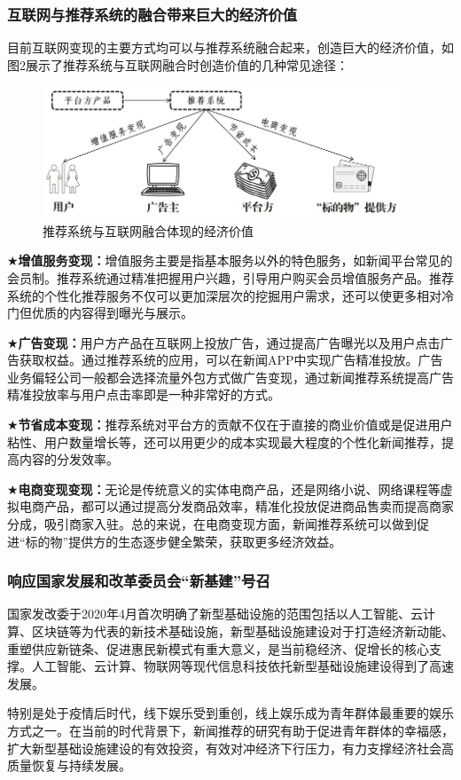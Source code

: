 \documentclass[withoutpreface,bwprint]{cumcmthesis} %
\begin{document}
	\subsubsection{ 互联网与推荐系统的融合带来巨大的经济价值}
	目前互联网变现的主要方式均可以与推荐系统融合起来，创造巨大的经济价值，如图2展示了推荐系统与互联网融合时创造价值的几种常见途径：
	\begin{figure}[H]
		\centering
		\includegraphics[width=0.95\textwidth]{1}
		\caption{推荐系统与互联网融合体现的经济价值}
		\label{fig:circuit-diagcam}
	\end{figure}
	$\bigstar$\textbf{增值服务变现：}增值服务主要是指基本服务以外的特色服务，如新闻平台常见的会员制。推荐系统通过精准把握用户兴趣，引导用户购买会员增值服务产品。推荐系统的个性化推荐服务不仅可以更加深层次的挖掘用户需求，还可以使更多相对冷门但优质的内容得到曝光与展示。\par
	$\bigstar$\textbf{广告变现：}用户方产品在互联网上投放广告，通过提高广告曝光以及用户点击广告获取权益。通过推荐系统的应用，可以在新闻APP中实现广告精准投放。广告业务偏轻公司一般都会选择流量外包方式做广告变现，通过新闻推荐系统提高广告精准投放率与用户点击率即是一种非常好的方式。\par
	$\bigstar$\textbf{节省成本变现：}推荐系统对平台方的贡献不仅在于直接的商业价值或是促进用户粘性、用户数量增长等，还可以用更少的成本实现最大程度的个性化新闻推荐，提高内容的分发效率。\par
	$\bigstar$\textbf{电商变现变现：}无论是传统意义的实体电商产品，还是网络小说、网络课程等虚拟电商产品，都可以通过提高分发商品效率，精准化投放促进商品售卖而提高商家分成，吸引商家入驻。总的来说，在电商变现方面，新闻推荐系统可以做到促进“标的物”提供方的生态逐步健全繁荣，获取更多经济效益。\par
	\subsubsection{ 响应国家发展和改革委员会“新基建”号召}
	 国家发改委于2020年4月首次明确了新型基础设施的范围包括以人工智能、云计算、区块链等为代表的新技术基础设施，新型基础设施建设对于打造经济新动能、重塑供应新链条、促进惠民新模式有重大意义，是当前稳经济、促增长的核心支撑。人工智能、云计算、物联网等现代信息科技依托新型基础设施建设得到了高速发展。\par
	 特别是处于疫情后时代，线下娱乐受到重创，线上娱乐成为青年群体最重要的娱乐方式之一。在当前的时代背景下，新闻推荐的研究有助于促进青年群体的幸福感，扩大新型基础设施建设的有效投资，有效对冲经济下行压力，有力支撑经济社会高质量恢复与持续发展。
\end{document}
